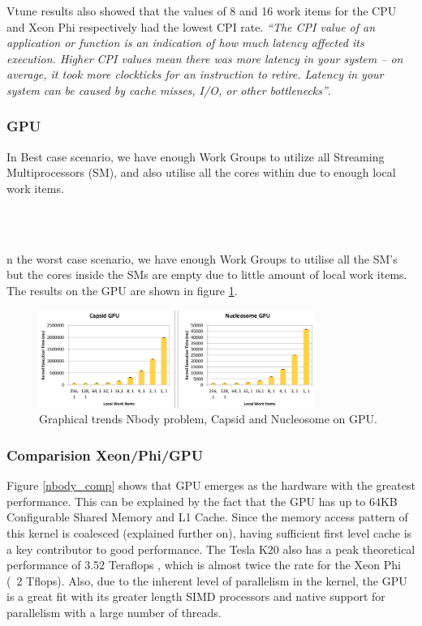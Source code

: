 \par{Vtune results also showed that the values of 8 and 16 work items for 
    the CPU and Xeon Phi respectively had the lowest CPI rate. 
    \emph{``The CPI value of an application or function is an indication 
    of how much latency affected its execution. Higher CPI values mean 
    there was more latency in your system – on average, it took more 
    clockticks for an instruction to retire. Latency in your system 
    can be caused by cache misses, I/O, or other bottlenecks''}.\cite{cpi}}

\subsubsection{GPU}
\par{In Best case scenario, we have enough Work Groups to utilize all 
    Streaming Multiprocessors (SM), and also utilise all the cores 
    within due to enough local work items.}

{\\}
{\\}

\par{n the worst case scenario, we have enough Work Groups 
    to utilise all the SM's but the cores inside the SMs 
    are empty due to little amount of local work items. The results
    on the GPU are shown in figure \ref{nbody_gpu}.}

\begin{figure}[!h]
    \centering
    \includegraphics[width=0.8\textwidth]{figures/nbody_gpu.png}
    \caption{Graphical trends Nbody problem, Capsid and Nucleosome on GPU.}
    \label{nbody_gpu}
\end{figure}
        
\subsubsection{Comparision Xeon/Phi/GPU}
\par{Figure \ref{nbody_comp} shows that GPU emerges as the hardware with the 
    greatest performance. 
    This can be explained by the fact that the GPU has up to 64KB 
    Configurable Shared Memory and L1 Cache. Since the memory 
    access pattern of this kernel is coalesced (explained further on), 
    having sufficient first level cache is a key contributor to good 
    performance. The Tesla K20 also has a peak theoretical performance 
    of 3.52 Teraflops 
    , which is almost twice the rate for the Xeon Phi (~2 Tflops). 
    Also, due to the inherent level of parallelism in the kernel, 
    the GPU is a great fit with its greater length SIMD processors 
    and native support for parallelism with a large number of threads.}

